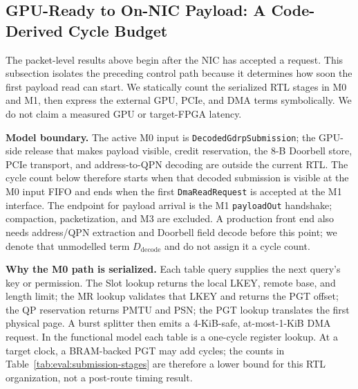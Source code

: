 \subsection{GPU-Ready to On-NIC Payload: A Code-Derived Cycle Budget}
\label{sec:eval:submission-cycles}

The packet-level results above begin after the NIC has accepted a request.  This
subsection isolates the preceding control path because it determines how soon
the first payload read can start.  We statically count the serialized RTL stages
in M0 and M1, then express the external GPU, PCIe, and DMA terms symbolically.
We do not claim a measured GPU or target-FPGA latency.


\textbf{Model boundary.}
The active M0 input is \texttt{DecodedGdrpSubmission}; the GPU-side release
that makes payload visible, credit reservation, the 8-B Doorbell store, PCIe
transport, and address-to-QPN decoding are outside the current RTL.  The cycle
count below therefore starts when that decoded submission is visible at the M0
input FIFO and ends when the first \texttt{DmaReadRequest} is accepted at the
M1 interface.  The endpoint for payload arrival is the M1 \texttt{payloadOut}
handshake; compaction, packetization, and M3 are excluded.  A production front
end also needs address/QPN extraction and Doorbell field decode before this
point; we denote that unmodelled term $D_{\mathrm{decode}}$ and do not assign
it a cycle count.

\textbf{Why the M0 path is serialized.}
Each table query supplies the next query's key or permission.  The Slot lookup
returns the local LKEY, remote base, and length limit; the MR lookup validates
that LKEY and returns the PGT offset; the QP reservation returns PMTU and PSN;
the PGT lookup translates the first physical page.  A burst splitter then emits
a 4-KiB-safe, at-most-1-KiB DMA request.  In the functional model each table is
a one-cycle register lookup.  At a target clock, a BRAM-backed PGT may add
cycles; the counts in Table~\ref{tab:eval:submission-stages} are therefore a
lower bound for this RTL organization, not a post-route timing result.

